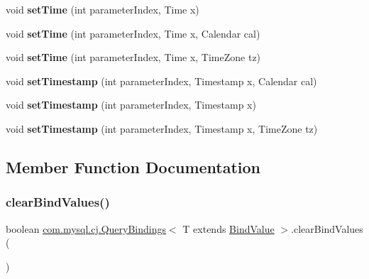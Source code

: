 \begin{DoxyCompactItemize}
void {\bfseries set\+Time} (int parameter\+Index, Time x)
\item 
\mbox{\label{interfacecom_1_1mysql_1_1cj_1_1_query_bindings_a71543151269616c6e2ba536f4e51d2b7}} 
void {\bfseries set\+Time} (int parameter\+Index, Time x, Calendar cal)
\item 
\mbox{\label{interfacecom_1_1mysql_1_1cj_1_1_query_bindings_a21ded062a41842f08c6f75878adfdc74}} 
void {\bfseries set\+Time} (int parameter\+Index, Time x, Time\+Zone tz)
\item 
\mbox{\label{interfacecom_1_1mysql_1_1cj_1_1_query_bindings_ad61211668a8f9590103454e6b3b3b127}} 
void {\bfseries set\+Timestamp} (int parameter\+Index, Timestamp x, Calendar cal)
\item 
\mbox{\label{interfacecom_1_1mysql_1_1cj_1_1_query_bindings_a08628284155246e9312c6c3dcd6ee54f}} 
void {\bfseries set\+Timestamp} (int parameter\+Index, Timestamp x)
\item 
\mbox{\label{interfacecom_1_1mysql_1_1cj_1_1_query_bindings_aac572e044c4913263d2d078ac54e4043}} 
void {\bfseries set\+Timestamp} (int parameter\+Index, Timestamp x, Time\+Zone tz)
\end{DoxyCompactItemize}


\subsection{Member Function Documentation}
\mbox{\label{interfacecom_1_1mysql_1_1cj_1_1_query_bindings_acd90572938fcce89fe68b9a3ba120372}} 
\subsubsection{\texorpdfstring{clear\+Bind\+Values()}{clearBindValues()}}
{\footnotesize\ttfamily boolean \mbox{\hyperlink{interfacecom_1_1mysql_1_1cj_1_1_query_bindings}{com.\+mysql.\+cj.\+Query\+Bindings}}$<$ T extends \mbox{\hyperlink{interfacecom_1_1mysql_1_1cj_1_1_bind_value}{Bind\+Value}} $>$.clear\+Bind\+Values (\begin{DoxyParamCaption}{ }\end{DoxyParamCaption})}

